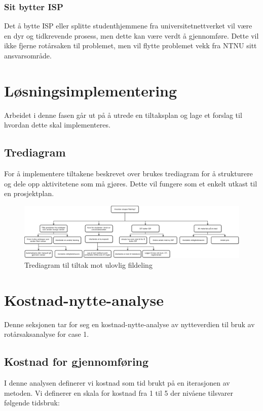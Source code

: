 \subsubsection{Sit bytter ISP}
Det å bytte ISP eller splitte studenthjemmene fra universitetnettverket vil være en dyr og tidkrevende prosess, men dette kan være verdt å gjennomføre. Dette vil ikke fjerne rotårsaken til problemet, men vil flytte problemet vekk fra NTNU sitt ansvarsområde.

\section{Løsningsimplementering}
Arbeidet i denne fasen går ut på å utrede en tiltaksplan og lage et forslag til hvordan dette skal implementeres.

\subsection{Trediagram}
For å implementere tiltakene beskrevet over brukes trediagram for å strukturere og dele opp aktivitetene som må gjøres. Dette vil fungere som et enkelt utkast til en prosjektplan. 

\begin{figure}[H] 
    \centering    
    \includegraphics[scale=0.55, angle=90]{case_1/bilder/Tre-diagram.pdf}
    \caption[Trediagram til tiltak mot ulovlig fildeling]{Trediagram til tiltak mot ulovlig fildeling}
    \label{fig:case1-Tre-diagram}
\end{figure}

\section{Kostnad-nytte-analyse}
\label{kost-nytte-case1}
Denne seksjonen tar for seg en kostnad-nytte-analyse av nytteverdien til bruk av rotårsaksanalyse for case 1. 

\subsection{Kostnad for gjennomføring}
I denne analysen definerer vi kostnad som tid brukt på en iterasjonen av metoden. Vi definerer en skala for kostnad fra 1 til 5 der nivåene tilsvarer følgende tidsbruk:

